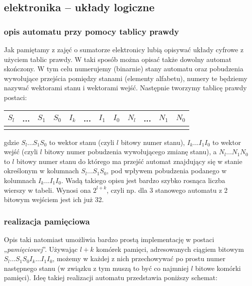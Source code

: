 \documentclass{pdfBooklets}
\begin{document}
\subsection{elektronika – układy logiczne}

\subsubsection{opis automatu przy pomocy tablicy prawdy}

Jak pamiętamy z zajęć o sumatorze elektronicy lubią opisywać układy cyfrowe z użyciem tablic prawdy. W taki sposób można opisać także dowolny automat skończony.
W tym celu numerujemy (binarnie) stany automatu oraz pobudzenia wywołujące przejścia pomiędzy stanami (elementy alfabetu), numery te będziemy nazywać wektorami stanu i wektorami wejść.
Następnie tworzymy tablicę prawdy postaci:

\begin{center}\begin{tabular}{c|c|c|c|c|c|c|c||c|c|c|c}
$S_l$ & ... & $S_1$ & $S_0$   &   $I_k$ & ... & $I_1$ & $I_0$   &    $N_l$ & ... & $N_1$ & $N_0$\\
\hline
& & &   &   & & &   &   & & &
\end{tabular}\end{center}

\noindent
gdzie $S_l ... S_1 S_0$ to wektor stanu (czyli $l$ bitowy numer stanu), $I_k ... I_1 I_0$ to wektor wejść (czyli $l$ bitowy numer pobudzenia wywołującego zmianę stanu), a $N_l ... N_1 N_0$ to $l$ bitowy numer stanu do którego ma przejść automat znajdujący się w stanie określonym w kolumnach $S_l ... S_1 S_0$, pod wpływem pobudzenia podanego w kolumnach $I_k ... I_1 I_0$.
Wadą takiego opisu jest bardzo szybko rosnąca liczba wierszy w tabeli. Wynosi ona $2^{l+k}$, czyli np. dla 3 stanowego automatu z 2 bitowym wejściem jest ich już 32.

\subsubsection{realizacja pamięciowa}

Opis taki natomiast umożliwia bardzo prostą implementację w postaci „\emph{pamięciowej}”. Używając $l+k$ komórek pamięci, adresowanych ciągiem bitowym $S_l ... S_1 S_0 I_k ... I_1 I_0$, możemy w każdej z nich przechowywać po prostu numer następnego stanu (w związku z tym muszą to być co najmniej $l$ bitowe komórki pamięci). Ideę takiej realizacji automatu przedstawia poniższy schemat:
\end{document}

